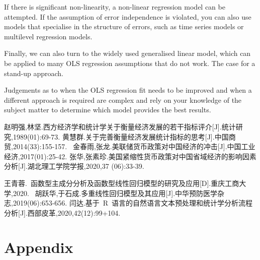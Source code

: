 \documentclass{apmcmthesis}
\begin{document}
If there is significant non-linearity, a non-linear regression model can be attempted. If the assumption of error independence is violated, you can also use models that specialise in the structure of errors, such as time series models or multilevel regression models. 
 
Finally, we can also turn to the widely used generalised linear model, which can be applied to many OLS regression assumptions that do not work.
The case for a stand-up approach.

Judgements as to when the OLS regression fit needs to be improved and when a different approach is required are complex and rely on your knowledge of the subject matter to determine which model provides the best results.

\begin{thebibliography}{9}%
\mbox{赵明强,林坚.西方经济学和统计学关于衡量经济发展的若干指标评介[J].统计研究},1989(01):69-73.
 \mbox{黄慧群.关于完善衡量经济发展统计指标的思考[J].中国商贸,2014(33):155-157. }
\mbox{金春雨,张龙.美联储货币政策对中国经济的冲击[J].中国工业经济,2017(01):25-42.}
\mbox{张华,张素珍.美国紧缩性货币政策对中国省域经济的影响因素分析[J].湖北理工学院学报},2020,37
(06):33-39. 

\mbox{王青蓉. 函数型主成分分析及函数型线性回归模型的研究及应用[D].重庆工商大学,2020. }
\mbox{胡跃华,于石成.多重线性回归模型及其应用[J].中华预防医学杂志,2019(06):653-656.}
\mbox{闫达.基于 R 语言的自然语言文本预处理和统计学分析流程分析[J].西部皮革,2020,42(12):99+104.}
\end{thebibliography}

\newpage

\section{Appendix}
\end{document}
